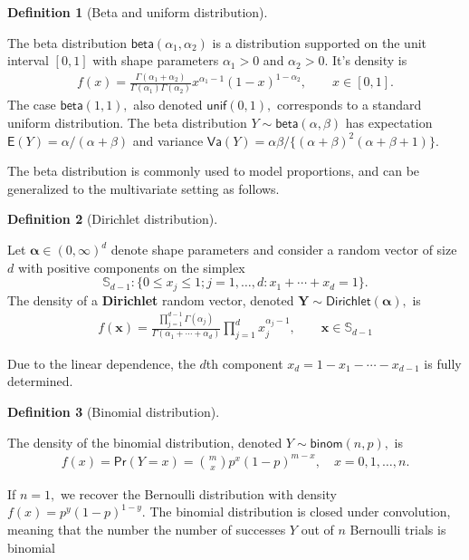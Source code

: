\documentclass[
  11pt,
  letterpaper,
]{scrbook}
\theoremstyle{definition}
\theoremstyle{plain}
\theoremstyle{plain}
\theoremstyle{plain}
\theoremstyle{definition}
\theoremstyle{definition}
\newtheorem{definition}{Definition}[chapter]
\theoremstyle{plain}
\theoremstyle{plain}
\theoremstyle{remark}
\begin{document}
\begin{definition}[Beta and uniform
distribution]\protect\hypertarget{def-beta}{}\label{def-beta}

The beta distribution \(\mathsf{beta}(\alpha_1, \alpha_2)\) is a
distribution supported on the unit interval \([0,1]\) with shape
parameters \(\alpha_1>0\) and \(\alpha_2>0.\) It's density is
\begin{align*}
f(x) = \frac{\Gamma(\alpha_1+\alpha_2)}{\Gamma(\alpha_1)\Gamma(\alpha_2)}x^{\alpha_1-1}(1-x)^{1-\alpha_2}, \qquad x \in [0,1].
\end{align*} The case \(\mathsf{beta}(1,1),\) also denoted
\(\mathsf{unif}(0,1),\) corresponds to a standard uniform distribution.
The beta distribution \(Y \sim \mathsf{beta}(\alpha, \beta)\) has
expectation \(\mathsf{E}(Y)=\alpha/(\alpha+\beta)\) and variance
\(\mathsf{Va}(Y)=\alpha\beta/\{(\alpha+\beta)^2(\alpha+\beta+1)\}\).

\end{definition}

The beta distribution is commonly used to model proportions, and can be
generalized to the multivariate setting as follows.

\begin{definition}[Dirichlet
distribution]\protect\hypertarget{def-dirichlet-dist}{}\label{def-dirichlet-dist}

Let \(\boldsymbol{\alpha} \in (0, \infty)^d\) denote shape parameters
and consider a random vector of size \(d\) with positive components on
the simplex
\[\mathbb{S}_{d-1}: \{ 0 \leq x_j \leq 1; j=1, \ldots, d: x_1 + \cdots + x_d=1\}.\]
The density of a \textbf{Dirichlet} random vector, denoted
\(\boldsymbol{Y} \sim \mathsf{Dirichlet}(\boldsymbol{\alpha}),\) is
\begin{align*}
f(\boldsymbol{x}) = \frac{\prod_{j=1}^{d-1}\Gamma(\alpha_j)}{\Gamma(\alpha_1 + \cdots + \alpha_d)}\prod_{j=1}^{d} x_j^{\alpha_j-1}, \qquad \boldsymbol{x} \in \mathbb{S}_{d-1}
\end{align*}

Due to the linear dependence, the \(d\)th component
\(x_d = 1- x_1 - \cdots - x_{d-1}\) is fully determined.

\end{definition}

\begin{definition}[Binomial
distribution]\protect\hypertarget{def-binomial}{}\label{def-binomial}

The density of the binomial distribution, denoted
\(Y \sim \mathsf{binom}(n, p),\) is \begin{align*}
f(x) = \mathsf{Pr}(Y=x) = \binom{m}{x}p^x (1-p)^{m-x}, \quad x=0, 1, \ldots, n.
\end{align*}

If \(n=1,\) we recover the Bernoulli distribution with density
\(f(x) = p^{y}(1-p)^{1-y}.\) The binomial distribution is closed under
convolution, meaning that the number the number of successes \(Y\) out
of \(n\) Bernoulli trials is binomial

\end{definition}
\end{document}

